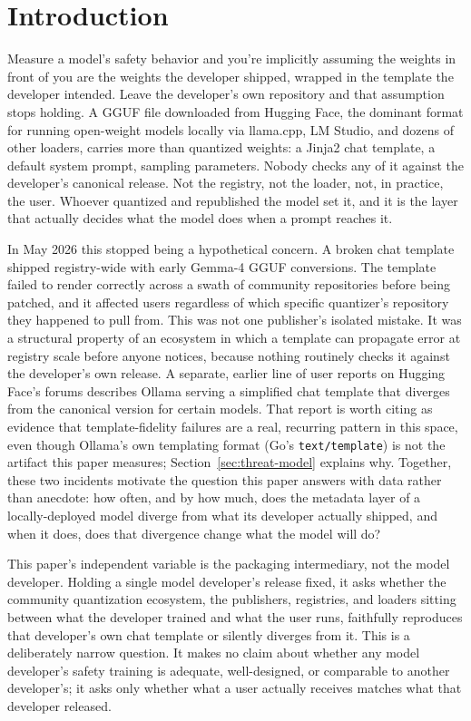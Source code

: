 \documentclass[letterpaper,twocolumn,10pt]{article}
\begin{document}
\section{Introduction}
\label{sec:intro}

Measure a model's safety behavior and you're implicitly assuming the weights in front of you are the weights the developer shipped, wrapped in the template the developer intended. Leave the developer's own repository and that assumption stops holding. A GGUF file downloaded from Hugging Face, the dominant format for running open-weight models locally via llama.cpp, LM Studio, and dozens of other loaders, carries more than quantized weights: a Jinja2 chat template, a default system prompt, sampling parameters. Nobody checks any of it against the developer's canonical release. Not the registry, not the loader, not, in practice, the user. Whoever quantized and republished the model set it, and it is the layer that actually decides what the model does when a prompt reaches it.

In May 2026 this stopped being a hypothetical concern. A broken chat template shipped registry-wide with early Gemma-4 GGUF conversions. The template failed to render correctly across a swath of community repositories before being patched, and it affected users regardless of which specific quantizer's repository they happened to pull from. This was not one publisher's isolated mistake. It was a structural property of an ecosystem in which a template can propagate error at registry scale before anyone notices, because nothing routinely checks it against the developer's own release. A separate, earlier line of user reports on Hugging Face's forums describes Ollama serving a simplified chat template that diverges from the canonical version for certain models. That report is worth citing as evidence that template-fidelity failures are a real, recurring pattern in this space, even though Ollama's own templating format (Go's \texttt{text/template}) is not the artifact this paper measures; Section~\ref{sec:threat-model} explains why. Together, these two incidents motivate the question this paper answers with data rather than anecdote: how often, and by how much, does the metadata layer of a locally-deployed model diverge from what its developer actually shipped, and when it does, does that divergence change what the model will do?

This paper's independent variable is the packaging intermediary, not the model developer. Holding a single model developer's release fixed, it asks whether the community quantization ecosystem, the publishers, registries, and loaders sitting between what the developer trained and what the user runs, faithfully reproduces that developer's own chat template or silently diverges from it. This is a deliberately narrow question. It makes no claim about whether any model developer's safety training is adequate, well-designed, or comparable to another developer's; it asks only whether what a user actually receives matches what that developer released.
\end{document}

